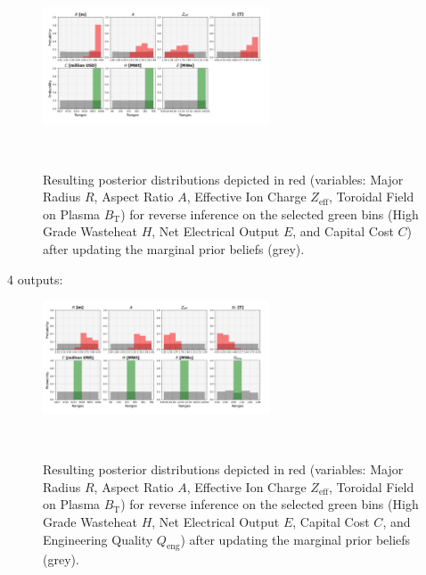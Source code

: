 \begin{figure}[ht]
    \centering
    \includegraphics[width=0.6\textwidth]{figures/TE_results/march_data/config(57)_3outputs_V2_9.png}
    \caption{Resulting posterior distributions depicted in red (variables: Major Radius $R$, Aspect Ratio $A$, Effective Ion Charge $Z_{\text{eff}}$, Toroidal Field on Plasma $B_{\text{T}}$) for reverse
    inference on the selected green bins (High Grade Wasteheat $H$, Net Electrical Output $E$, and  Capital Cost $C$) after updating the marginal prior beliefs (grey).}~\label{fig:config(57)_3outputs_V2_9}
\end{figure}



4 outputs: 

\begin{figure}[ht]
    \centering
    \includegraphics[width=0.6\textwidth]{figures/TE_results/march_data/config(57)_4outputs_1.png}
    \caption{Resulting posterior distributions depicted in red (variables: Major Radius $R$, Aspect Ratio $A$, Effective Ion Charge $Z_{\text{eff}}$, Toroidal Field on Plasma $B_{\text{T}}$) for reverse
    inference on the selected green bins (High Grade Wasteheat $H$, Net Electrical Output $E$, Capital Cost $C$, and Engineering Quality $Q_{\text{eng}}$) after updating the marginal prior beliefs (grey).}~\label{fig:config(57)_4outputs_1}
\end{figure}

